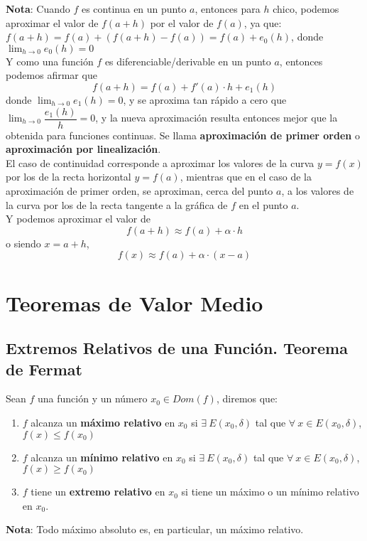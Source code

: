 \documentclass[11pt,a4paper]{article}
\begin{document}
\noindent \textbf{Nota}: Cuando $f$ es continua en un punto $a$, entonces para $h$ chico, podemos aproximar el valor de $f(a+h)$ por el valor de $f(a)$, ya que: $f(a+h)=f(a)+(f(a+h)-f(a)) = f(a) + e_0(h)$, donde $\displaystyle{\lim_{h \to 0} e_0(h) = 0}$\\

Y como una funci\'on $f$ es diferenciable/derivable en un punto $a$, entonces podemos afirmar que $$f(a+h) = f(a)+f'(a)\cdot h + e_1(h)$$ donde $\displaystyle{\lim_{h \to 0} e_1(h) = 0}$, y se aproxima tan r\'apido a cero que $\displaystyle{\lim_{h \to 0} \dfrac{e_1(h)}{h} = 0}$, y la nueva aproximaci\'on resulta entonces mejor que la obtenida para funciones continuas. Se llama \textbf{aproximaci\'on de primer orden} o \textbf{aproximaci\'on por linealizaci\'on}.\\

El caso de continuidad corresponde a aproximar los valores de la curva $y=f(x)$ por los de la recta horizontal $y=f(a)$, mientras que en el caso de la aproximaci\'on de primer orden, se aproximan, cerca del punto $a$, a los valores de la curva por los de la recta tangente a la gr\'afica de $f$ en el punto $a$.\\

\noindent Y podemos aproximar el valor de $$f(a+h) \approx f(a) + \alpha \cdot h$$ o siendo $x = a+h$, $$f(x) \approx f(a) + \alpha \cdot (x-a)$$

\newpage
\section{Teoremas de Valor Medio}
\subsection{Extremos Relativos de una Funci\'on. Teorema de Fermat}
Sean $f$ una funci\'on y un n\'umero $x_0 \in Dom(f)$, diremos que:
\begin{enumerate}
\item $f$ alcanza un \textbf{m\'aximo relativo} en $x_0$ si $\exists\ E(x_0, \delta)$ tal que $\forall\ x\in E(x_0, \delta)$, $f(x) \leq f(x_0)$
\item $f$ alcanza un \textbf{m\'inimo relativo} en $x_0$ si $\exists\ E(x_0, \delta)$ tal que $\forall\ x\in E(x_0, \delta)$, $f(x) \geq f(x_0)$
\item $f$ tiene un \textbf{extremo relativo} en $x_0$ si tiene un m\'aximo o un m\'inimo relativo en $x_0$.
\end{enumerate}
\textbf{Nota}: Todo m\'aximo absoluto es, en particular, un m\'aximo relativo.\\
\end{document}
